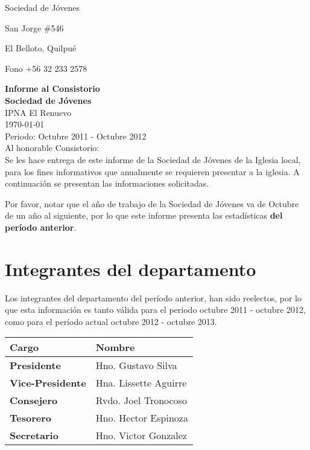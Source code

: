 \documentclass[12pt,letterpaper]{article}
\begin{document}
\hfill Sociedad de Jóvenes

\hfill San Jorge \#546

\hfill El Belloto, Quilpué

\hfill Fono +56 32 233 2578

\hfill \textbf{Informe al Consistorio}
\\
\textbf{Sociedad de Jóvenes} \\ IPNA El Renuevo \\  \today \\ Periodo: Octubre 2011 - Octubre 2012\\

Al honorable Consistorio:\\

Se les hace entrega de este informe de la Sociedad de Jóvenes de la Iglesia local, para los fines informativos que anualmente se requieren presentar a la iglesia. A continuación se presentan las informaciones solicitadas.

Por favor, notar que el año de trabajo de la Sociedad de Jóvenes va de Octubre de un año al siguiente, por lo que este informe presenta las estadísticas \textbf{del período anterior}.

\section{Integrantes del departamento}

Los integrantes del departamento del período anterior, han sido reelectos, por lo que esta información es tanto válida para el periodo octubre 2011 - octubre 2012, como para el período actual octubre 2012 - octubre 2013.

\begin{table}[!h]
\centering
\begin{tabular}{|l|l|}
\hline
\textbf{Cargo} & \textbf{Nombre} \\
\hline \hline
\textbf{Presidente} & Hno. Gustavo Silva \\ \hline
\textbf{Vice-Presidente} & Hna. Lissette Aguirre \\ \hline
\textbf{Consejero} & Rvdo. Joel Tronocoso \\ \hline
\textbf{Tesorero} & Hno. Hector Espinoza \\ \hline
\textbf{Secretario} & Hno. Victor Gonzalez \\ \hline
\end{tabular}
\end{table}

\newpage
\end{document}
